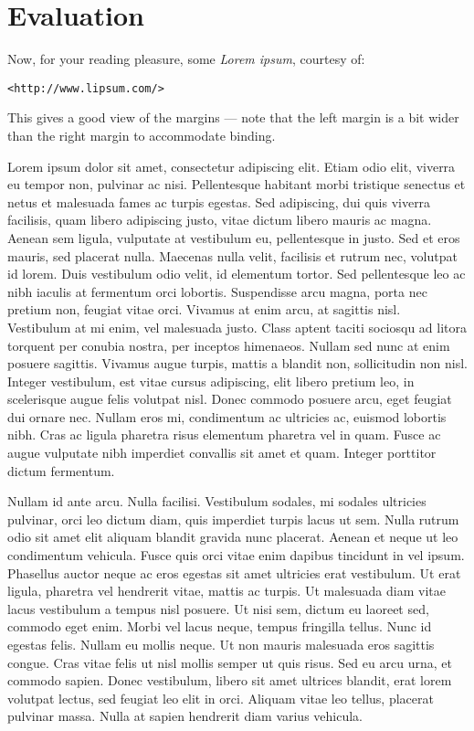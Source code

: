 \chapter{Evaluation}
\label{chap:ch4_abbr}
Now, for your reading pleasure, some \textsl{Lorem ipsum}, courtesy
of:
\begin{center}
\texttt{<http://www.lipsum.com/>}
\end{center}
This gives a good view of the margins --- note that the left margin
is a bit wider than the right margin to accommodate binding.

Lorem ipsum dolor sit amet, consectetur adipiscing elit. Etiam odio elit,
viverra eu tempor non, pulvinar ac nisi. Pellentesque habitant morbi
tristique senectus et netus et malesuada fames ac turpis egestas. Sed
adipiscing, dui quis viverra facilisis, quam libero adipiscing justo,
vitae dictum libero mauris ac magna. Aenean sem ligula, vulputate at
vestibulum eu, pellentesque in justo. Sed et eros mauris, sed placerat
nulla. Maecenas nulla velit, facilisis et rutrum nec, volutpat id
lorem. Duis vestibulum odio velit, id elementum tortor. Sed pellentesque
leo ac nibh iaculis at fermentum orci lobortis. Suspendisse arcu magna,
porta nec pretium non, feugiat vitae orci. Vivamus at enim arcu,
at sagittis nisl. Vestibulum at mi enim, vel malesuada justo. Class
aptent taciti sociosqu ad litora torquent per conubia nostra, per
inceptos himenaeos. Nullam sed nunc at enim posuere sagittis. Vivamus
augue turpis, mattis a blandit non, sollicitudin non nisl. Integer
vestibulum, est vitae cursus adipiscing, elit libero pretium leo,
in scelerisque augue felis volutpat nisl. Donec commodo posuere arcu,
eget feugiat dui ornare nec. Nullam eros mi, condimentum ac ultricies ac,
euismod lobortis nibh. Cras ac ligula pharetra risus elementum pharetra
vel in quam. Fusce ac augue vulputate nibh imperdiet convallis sit amet
et quam. Integer porttitor dictum fermentum.

Nullam id ante arcu. Nulla facilisi. Vestibulum sodales, mi sodales
ultricies pulvinar, orci leo dictum diam, quis imperdiet turpis lacus
ut sem. Nulla rutrum odio sit amet elit aliquam blandit gravida nunc
placerat. Aenean et neque ut leo condimentum vehicula. Fusce quis orci
vitae enim dapibus tincidunt in vel ipsum. Phasellus auctor neque ac eros
egestas sit amet ultricies erat vestibulum. Ut erat ligula, pharetra
vel hendrerit vitae, mattis ac turpis. Ut malesuada diam vitae lacus
vestibulum a tempus nisl posuere. Ut nisi sem, dictum eu laoreet sed,
commodo eget enim. Morbi vel lacus neque, tempus fringilla tellus. Nunc
id egestas felis. Nullam eu mollis neque. Ut non mauris malesuada
eros sagittis congue. Cras vitae felis ut nisl mollis semper ut quis
risus. Sed eu arcu urna, et commodo sapien. Donec vestibulum, libero
sit amet ultrices blandit, erat lorem volutpat lectus, sed feugiat leo
elit in orci. Aliquam vitae leo tellus, placerat pulvinar massa. Nulla
at sapien hendrerit diam varius vehicula.

